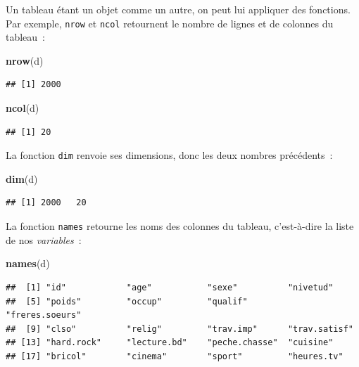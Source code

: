 \documentclass[12pt,]{book}
\newenvironment{Shaded}{\begin{snugshade}}{\end{snugshade}}
\newcommand{\KeywordTok}[1]{\textcolor[rgb]{0.27,0.27,0.27}{\textbf{#1}}}
\newcommand{\NormalTok}[1]{#1}
\begin{document}
Un tableau étant un objet comme un autre, on peut lui appliquer des fonctions. Par exemple, \texttt{nrow} et \texttt{ncol} retournent le nombre de lignes et de colonnes du tableau~:

\begin{Shaded}
\begin{Highlighting}[]
\KeywordTok{nrow}\NormalTok{(d)}
\end{Highlighting}
\end{Shaded}

\begin{verbatim}
## [1] 2000
\end{verbatim}

\begin{Shaded}
\begin{Highlighting}[]
\KeywordTok{ncol}\NormalTok{(d)}
\end{Highlighting}
\end{Shaded}

\begin{verbatim}
## [1] 20
\end{verbatim}

La fonction \texttt{dim} renvoie ses dimensions, donc les deux nombres précédents~:

\begin{Shaded}
\begin{Highlighting}[]
\KeywordTok{dim}\NormalTok{(d)}
\end{Highlighting}
\end{Shaded}

\begin{verbatim}
## [1] 2000   20
\end{verbatim}

La fonction \texttt{names} retourne les noms des colonnes du tableau, c'est-à-dire la liste de nos \emph{variables}~:

\begin{Shaded}
\begin{Highlighting}[]
\KeywordTok{names}\NormalTok{(d)}
\end{Highlighting}
\end{Shaded}

\begin{verbatim}
##  [1] "id"            "age"           "sexe"          "nivetud"      
##  [5] "poids"         "occup"         "qualif"        "freres.soeurs"
##  [9] "clso"          "relig"         "trav.imp"      "trav.satisf"  
## [13] "hard.rock"     "lecture.bd"    "peche.chasse"  "cuisine"      
## [17] "bricol"        "cinema"        "sport"         "heures.tv"
\end{verbatim}
\end{document}
